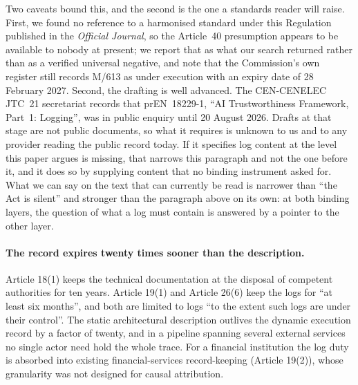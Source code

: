 \documentclass[11pt]{article}
\theoremstyle{remark}
\begin{document}
Two caveats bound this, and the second is the one a standards reader will raise.
First, we found no reference to a harmonised standard under this Regulation
published in the \emph{Official Journal}, so the Article~40 presumption appears
to be available to nobody at present; we report that as what our search returned
rather than as a verified universal negative, and note that the Commission's own
register still records M/613 as under execution with an expiry date of 28
February 2027. Second, the drafting is well advanced. The CEN-CENELEC JTC~21
secretariat records that prEN~18229-1, ``AI Trustworthiness Framework, Part~1:
Logging'', was in public enquiry until 20 August 2026. Drafts at that stage are
not public documents, so what it requires is unknown to us and to any provider
reading the public record today. If it specifies log content at the level this
paper argues is missing, that narrows this paragraph and not the one before it,
and it does so by supplying content that no binding instrument asked for. What we
can say on the text that can currently be read is narrower than ``the Act is
silent'' and stronger than the paragraph above on its own: at both binding
layers, the question of what a log must contain is answered by a pointer to the
other layer.

\paragraph{The record expires twenty times sooner than the description.} Article
18(1) keeps the technical documentation at the disposal of competent authorities
for ten years. Article 19(1) and Article 26(6) keep the logs for ``at least six
months'', and both are limited to logs ``to the extent such logs are under their
control''. The static architectural description outlives the dynamic execution
record by a factor of twenty, and in a pipeline spanning several external
services no single actor need hold the whole trace. For a financial institution
the log duty is absorbed into existing financial-services record-keeping
(Article 19(2)), whose granularity was not designed for causal attribution.
\end{document}
